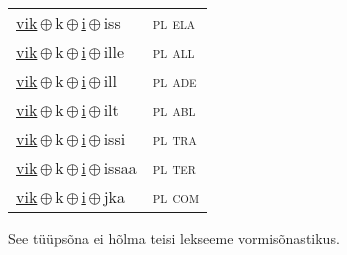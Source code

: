 \begin{minipage}{\textwidth}
\begin{sideways}
\begin{tabular}{l l}
\underline{vik}\,$\oplus$\,k\,$\oplus$\,\underline{i}\,$\oplus$\,iss & \textsc{ pl ela } \\
\underline{vik}\,$\oplus$\,k\,$\oplus$\,\underline{i}\,$\oplus$\,ille & \textsc{ pl all } \\
\underline{vik}\,$\oplus$\,k\,$\oplus$\,\underline{i}\,$\oplus$\,ill & \textsc{ pl ade } \\
\underline{vik}\,$\oplus$\,k\,$\oplus$\,\underline{i}\,$\oplus$\,ilt & \textsc{ pl abl } \\
\underline{vik}\,$\oplus$\,k\,$\oplus$\,\underline{i}\,$\oplus$\,issi & \textsc{ pl tra } \\
\underline{vik}\,$\oplus$\,k\,$\oplus$\,\underline{i}\,$\oplus$\,issaa & \textsc{ pl ter } \\
\underline{vik}\,$\oplus$\,k\,$\oplus$\,\underline{i}\,$\oplus$\,jka & \textsc{ pl com } \\
\end{tabular}
\end{sideways}
\label{tab:tüüpsõnamall-viki}

\end{minipage}

 
\vspace{1em}
\noindent See tüüpsõna ei hõlma teisi lekseeme vormi\-sõnastikus.

